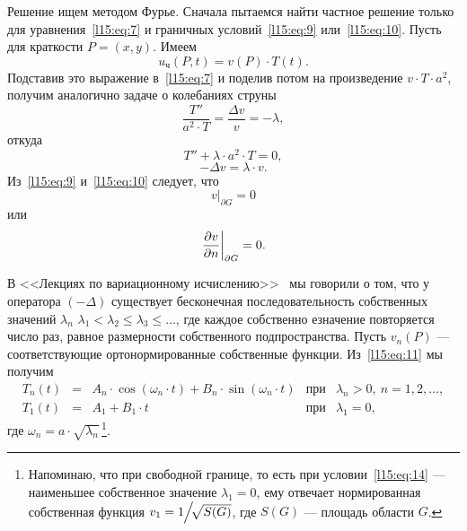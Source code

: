 Решение ищем методом Фурье. Сначала пытаемся найти частное решение только для уравнения~\eqref{l15:eq:7} и граничных условий~\eqref{l15:eq:9} или~\eqref{l15:eq:10}. Пусть для краткости $P=(x,y)$. Имеем
\begin{equation*}
	 u_{\text{ч}}(P,t)=v(P)\cdot T(t).
\end{equation*}
Подставив это выражение в~\eqref{l15:eq:7} и поделив потом на произведение $v\cdot T\cdot a^2$,  получим аналогично задаче о колебаниях струны 
\begin{equation*}
	 \frac{T''}{a^2\cdot T}=\frac{\Delta v}{v}=-\lambda,
\end{equation*} 
откуда 
\begin{equation}\label{l15:eq:11}
	 T''+\lambda\cdot a^2\cdot T=0,
\end{equation}
\begin{equation}\label{l15:eq:12}
	 -\Delta v=\lambda\cdot v.
\end{equation}
Из~\eqref{l15:eq:9} и~\eqref{l15:eq:10} следует, что 
\begin{equation}\label{l15:eq:13}
	 v\Big|_{\partial G}=0
\end{equation}
или 
\begin{equation}\label{l15:eq:14}
	 \left.\frac{\partial v}{\partial n}\right|_{\partial G}=0.
\end{equation}

В <<Лекциях по вариационному исчислению>>~\cite{VI} мы говорили о том, что у оператора $(-\Delta)$ существует бесконечная последовательность собственных значений $\lambda_n$ $\lambda_1<\lambda_2\leqslant\lambda_3\leqslant\ldots$, где каждое собственно езначение повторяется число раз, равное размерности собственного подпространства. Пусть $v_n(P)$ --- соответствующие ортонормированные собственные функции. Из~\eqref{l15:eq:11} мы получим
\begin{equation*}
	 \begin{array}{rclll}
		T_n(t)\!\!&=&\!\!A_n\cdot\cos\left(\omega_n\cdot t\right)+B_n\cdot\sin\left(\omega_n\cdot t\right)&\text{при}&\lambda_n>0,\ n=1,2,\ldots,\\
		T_1(t)\!\!&=&\!\!A_1+B_1\cdot t&\text{при}&\lambda_1=0,
	\end{array}
\end{equation*}
где $\omega_n=a\cdot\sqrt{\lambda_n}$\,\footnote{Напоминаю, что при свободной границе, то есть при условии~\eqref{l15:eq:14} --- наименьшее собственное значение $\lambda_1=0$, ему отвечает нормированная собственная функция $v_1=1\!\!\Bigm/\!\!\!\sqrt{S(G)}$, где $S(G)$ --- площадь области $G$.}. 

